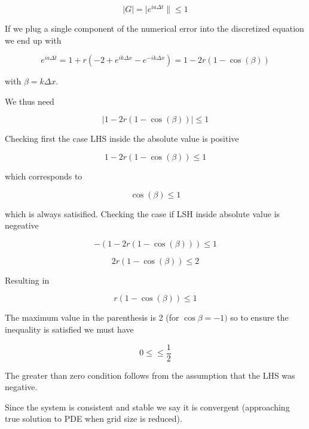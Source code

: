 \documentclass{article}
\begin{document}
\begin{equation}	
	|G| = |e^{ia\Delta t}\| \leq 1
\end{equation}

If we plug a single component of the numerical error into the discretized equation we end up with

\begin{equation}
 	e^{ia\Delta t} = 1 + r(-2+e^{ik\Delta x}-e^{-ik\Delta x}) = 1 - 2r(1-\cos(\beta))
\end{equation}

with $\beta = k \Delta x$.

We thus need

\begin{equation}
	|1 - 2r(1-\cos(\beta))| \leq 1
\end{equation}

Checking first the case LHS inside the absolute value is positive

\begin{equation}
	1 - 2r(1-\cos(\beta)) \leq 1
\end{equation}

which corresponds to 

\begin{equation}
	\cos(\beta) \leq 1
\end{equation}

which is always satisified. Checking the case if LSH inside absolute value is negeative

\begin{equation}
	-(1 - 2r(1-\cos(\beta))) \leq 1
\end{equation}

\begin{equation}
	 2r(1-\cos(\beta)) \leq 2
\end{equation}

Resulting in

\begin{equation}
	r(1-\cos(\beta)) \leq 1
\end{equation}

The maximum value in the parenthesis is 2 (for $\cos\beta = -1)$ so to ensure the inequality is satisfied we must have

\begin{equation}
 	0 \leq \leq \frac{1}{2}
\end{equation}

The greater than zero condition follows from the assumption that the LHS was negative.

Since the system is consistent and stable we say it is convergent (approaching true solution to PDE when grid size is reduced).
\end{document}
